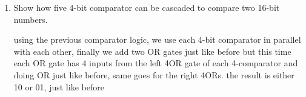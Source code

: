 \documentclass[16pt,answers]{exam}
\begin{document}
\begin{questions}
\begin{enumerate}
\begin{solution}
\begin{figure}[H]
		\end{figure}
	\end{solution}
	\item Show how five 4-bit comparator can be cascaded to compare two 16-bit
	numbers.
	\begin{solution}
		using the previous comparator logic, we use each 4-bit comparator in parallel with each other, finally we add two OR gates just like before but this time each OR gate has 4 inputs from the left 4OR gate of each 4-comparator and doing OR just like before, same goes for the right 4ORs. the result is either 10 or 01, just like before 
	\end{solution}	
\end{enumerate}


\end{questions}
\end{document}
